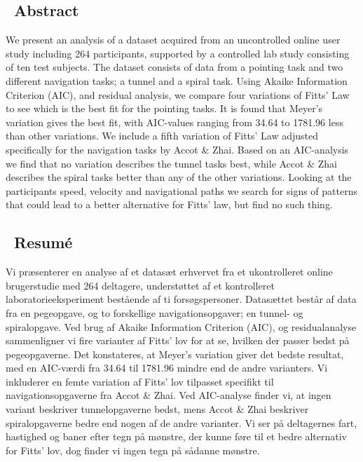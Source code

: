 

\subsection*{\centering~Abstract}
We present an analysis of a dataset acquired from an uncontrolled online user study including 264 participants, supported by a controlled lab study consisting of ten test subjects. The dataset consists of data from a pointing task and two different navigation tasks; a tunnel and a spiral task. Using Akaike Information Criterion (AIC), and residual analysis, we compare four variations of Fitts' Law to see which is the best fit for the pointing tasks. It is found that Meyer's variation gives the best fit, with AIC-values ranging from 34.64 to 1781.96 less than other variations. We include a fifth variation of Fitts' Law adjusted specifically for the navigation tasks by Accot \& Zhai. Based on an AIC-analysis we find that no variation describes the tunnel tasks best, while Accot \& Zhai describes the spiral tasks better than any of the other variations. Looking at the participants speed, velocity and navigational paths we search for signs of patterns that could lead to a better alternative for Fitts' law, but find no such thing.

\subsection*{\centering~Resumé}

Vi præsenterer en analyse af et datasæt erhvervet fra et ukontrolleret online brugerstudie med 264 deltagere, understøttet af et kontrolleret laboratorieeksperiment bestående af ti forsøgspersoner. Datasættet består af data fra en pegeopgave, og to forskellige navigationsopgaver; en tunnel- og spiralopgave. Ved brug af Akaike Information Criterion (AIC), og residualanalyse sammenligner vi fire varianter af Fitts' lov for at se, hvilken der passer bedst på pegeopgaverne. Det konstateres, at Meyer's variation giver det bedste resultat, med en AIC-værdi fra 34.64 til 1781.96 mindre end de andre varianters. Vi inkluderer en femte variation af Fitts' lov tilpasset specifikt til navigationsopgaverne fra Accot \& Zhai. Ved AIC-analyse finder vi, at ingen variant beskriver tunnelopgaverne bedst, mens Accot \& Zhai beskriver spiralopgaverne bedre end nogen af de andre varianter. Vi ser på deltagernes fart, hastighed og baner efter tegn på mønstre, der kunne føre til et bedre alternativ for Fitts' lov, dog finder vi ingen tegn på sådanne mønstre.

